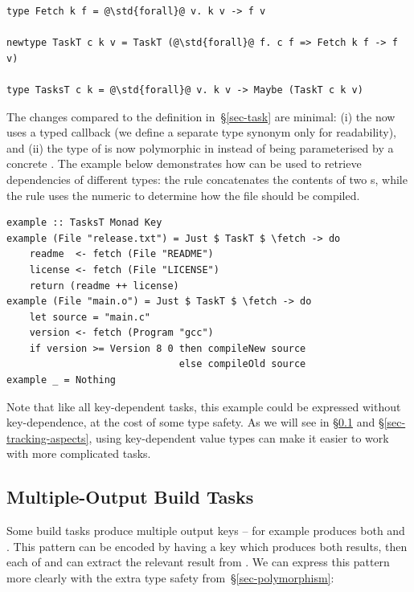 \vspace{1mm}
\begin{verbatim}
type Fetch k f = @\std{forall}@ v. k v -> f v

newtype TaskT c k v = TaskT (@\std{forall}@ f. c f => Fetch k f -> f v)

type TasksT c k = @\std{forall}@ v. k v -> Maybe (TaskT c k v)
\end{verbatim}
\vspace{1mm}

\noindent
The changes compared to the definition in~\S\ref{sec-task} are minimal: (i) the
 now uses a typed  callback (we define a separate type
synonym only for readability), and (ii) the type of  is now
polymorphic in  instead of being parameterised by a concrete . The
example below demonstrates how  can be used to retrieve dependencies
of different types: the rule  concatenates the contents of two
s, while the rule  uses the numeric  to
determine how the  file should be compiled.

\vspace{1mm}
\begin{verbatim}
example :: TasksT Monad Key
example (File "release.txt") = Just $ TaskT $ \fetch -> do
    readme  <- fetch (File "README")
    license <- fetch (File "LICENSE")
    return (readme ++ license)
example (File "main.o") = Just $ TaskT $ \fetch -> do
    let source = "main.c"
    version <- fetch (Program "gcc")
    if version >= Version 8 0 then compileNew source
                              else compileOld source
example _ = Nothing
\end{verbatim}
\vspace{1mm}

Note that like all key-dependent tasks, this example could be expressed
without key-dependence, at the cost of some type safety. As we will see in
\S\ref{sec-multiple-outputs} and \S\ref{sec-tracking-aspects}, using key-dependent
value types can make it easier to work with more complicated tasks.

\subsection{Multiple-Output Build Tasks}\label{sec-multiple-outputs}

Some build tasks produce multiple output keys -- for example  produces both
 and . This pattern can be encoded by having a key  which produces
both results, then each of  and  can extract the relevant result
from . We can express this pattern more clearly with the extra type safety
from~\S\ref{sec-polymorphism}:


